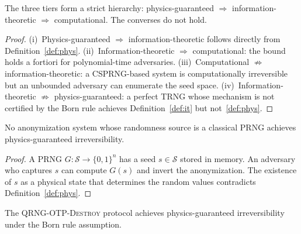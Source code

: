 \documentclass[acmsmall,screen,review,anonymous]{acmart}
\begin{document}
\begin{lemma}
\label{lem:hierarchy}
The three tiers form a strict hierarchy: physics-guaranteed $\Rightarrow$ information-theoretic $\Rightarrow$ computational. The converses do not hold.
\end{lemma}

\begin{proof}
(i)~Physics-guaranteed $\Rightarrow$ information-theoretic follows directly from Definition~\ref{def:phys}. (ii)~Information-theoretic $\Rightarrow$ computational: the bound holds a fortiori for polynomial-time adversaries. (iii)~Computational $\not\Rightarrow$ information-theoretic: a CSPRNG-based system is computationally irreversible but an unbounded adversary can enumerate the seed space. (iv)~Information-theoretic $\not\Rightarrow$ physics-guaranteed: a perfect TRNG whose mechanism is not certified by the Born rule achieves Definition~\ref{def:it} but not~\ref{def:phys}.
\end{proof}

\begin{theorem}
\label{thm:prng_impossible}
No anonymization system whose randomness source is a classical PRNG achieves physics-guaranteed irreversibility.
\end{theorem}

\begin{proof}
A PRNG $G\colon \mathcal{S} \to \{0,1\}^n$ has a seed $s \in \mathcal{S}$ stored in memory. An adversary who captures $s$ can compute $G(s)$ and invert the anonymization. The existence of $s$ as a physical state that determines the random values contradicts Definition~\ref{def:phys}.
\end{proof}

\begin{theorem}
\label{thm:qrng_secure}
The \textsc{QRNG-OTP-Destroy} protocol achieves physics-guaranteed irreversibility under the Born rule assumption.
\end{theorem}
\end{document}
